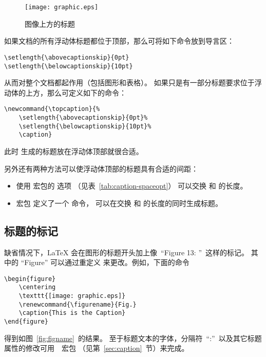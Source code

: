 \begin{figure} 
	\setlength{\abovecaptionskip}{0pt} 
	\setlength{\belowcaptionskip}{10pt} 
	\centering 
	\caption{图像上方的标题}\label{fig:normalabovefig}
	\texttt{[image: graphic.eps]} 
\end{figure}

如果文档的所有浮动体标题都位于顶部，那么可将如下命令放到导言区：
\begin{lstlisting}
\setlength{\abovecaptionskip}{0pt}
\setlength{\belowcaptionskip}{10pt}
\end{lstlisting}
从而对整个文档都起作用（包括图形和表格）。
如果只是有一部分标题要求位于浮动体的上方，那么可定义如下的命令：
\begin{lstlisting}
\newcommand{\topcaption}{% 
	\setlength{\abovecaptionskip}{0pt}% 
	\setlength{\belowcaptionskip}{10pt}% 
	\caption}
\end{lstlisting}
此时  生成的标题放在浮动体顶部就很合适。

另外还有两种方法可以使浮动体顶部的标题具有合适的间距：
\begin{itemize}
	\item 使用  宏包的  选项
	（见表~\ref{tab:caption-spaceopt}）
	可以交换  和  的长度。
	
	\item {} 宏包 \cite{topcapt-doc} 定义了一个  命令，
	可以在交换   和  的长度的同时生成标题。
\end{itemize}

\subsection{标题的标记}\label{ssec:captionlabel}

缺省情况下，\LaTeX{} 会在图形的标题开头加上像~``Figure 13: ''~这样的标记。
其中的 ``Figure'' 可以通过重定义  来更改。例如，下面的命令
\begin{lstlisting}
\begin{figure} 
	\centering 
	\texttt{[image: graphic.eps]} 
	\renewcommand{\figurename}{Fig.} 
	\caption{This is the Caption} 
\end{figure}
\end{lstlisting}
得到如图~\ref{fig:figname}~的结果。
至于标题文本的字体，分隔符~``:''~以及其它标题属性的修改可用~~宏包
（见第~\ref{sec:caption}~节）来完成。

